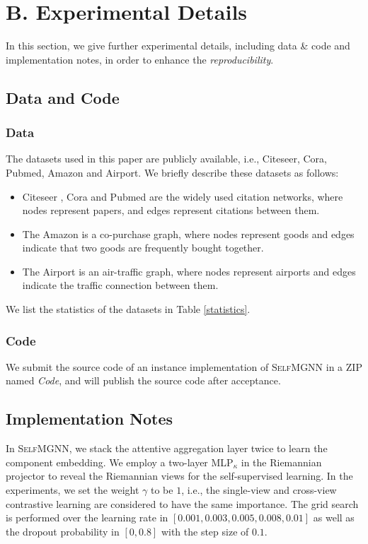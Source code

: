 \section{B. Experimental Details}
In this section, we give further experimental details, including data \& code  and implementation notes, in order to enhance the \emph{reproducibility}.
\subsection{Data and Code}
\subsubsection{Data} The datasets used in this paper are publicly available, i.e., Citeseer, Cora, Pubmed, Amazon and Airport. We briefly describe these datasets as follows:
\begin{itemize}
   \item Citeseer , Cora and Pubmed are the widely used citation networks, where nodes represent papers, and edges represent citations between them.
   \item The Amazon is a co-purchase graph, where nodes represent goods and edges indicate that two goods are frequently bought together. 
   \item The Airport is an air-traffic graph,  where nodes represent airports and edges indicate the traffic connection between them.
\end{itemize}
We list the statistics of  the datasets in Table \ref{statistics}. 


\subsubsection{Code} We submit the source code of an instance implementation of \textsc{SelfMGNN} in a ZIP named \emph{Code}, and will publish the source code after acceptance.  
\subsection{Implementation Notes}
In \textsc{SelfMGNN}, we stack the attentive aggregation layer twice to learn the  component embedding. 
We employ a two-layer MLP$_\kappa$ in the Riemannian projector to reveal the Riemannian views for the self-supervised learning. 
In the experiments, we set the weight $\gamma$ to be $1$, i.e., the single-view and cross-view contrastive learning are considered to have the same importance.
The grid search is performed over the learning rate in $[0.001, 0.003, 0.005, 0.008, 0.01]$ as well as the dropout probability in $[0, 0.8]$ with the step size of $0.1$.

